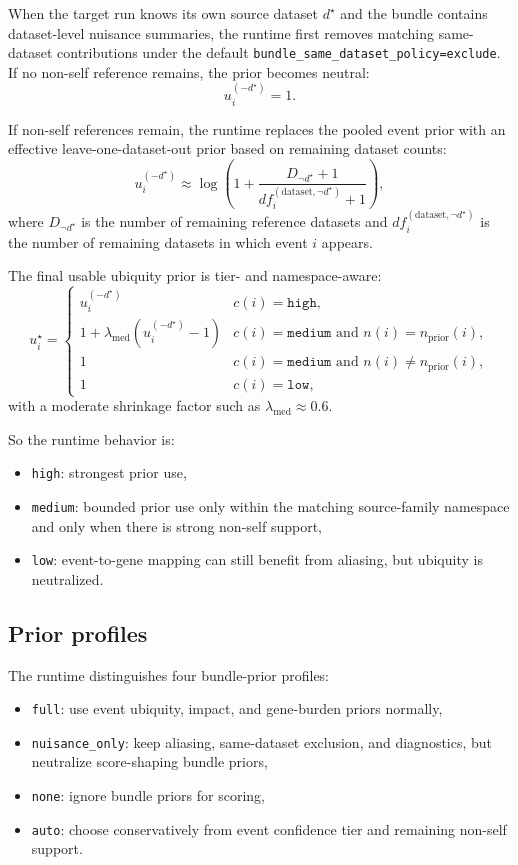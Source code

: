 \documentclass[11pt]{article}
\begin{document}
When the target run knows its own source dataset $d^\star$ and the bundle contains dataset-level nuisance summaries, the runtime first removes matching same-dataset contributions under the default \texttt{bundle\_same\_dataset\_policy=exclude}. If no non-self reference remains, the prior becomes neutral:
\[
u_i^{(-d^\star)} = 1.
\]

If non-self references remain, the runtime replaces the pooled event prior with an effective leave-one-dataset-out prior based on remaining dataset counts:
\[
u_i^{(-d^\star)} \approx \log\!\left(1 + \frac{D_{\neg d^\star}+1}{df_i^{(\mathrm{dataset}, \neg d^\star)}+1}\right),
\]
where $D_{\neg d^\star}$ is the number of remaining reference datasets and $df_i^{(\mathrm{dataset}, \neg d^\star)}$ is the number of remaining datasets in which event $i$ appears.

The final usable ubiquity prior is tier- and namespace-aware:
\[
u_i^\star =
\begin{cases}
u_i^{(-d^\star)} & c(i)=\texttt{high},\\
1 + \lambda_{\mathrm{med}} \left(u_i^{(-d^\star)} - 1\right) & c(i)=\texttt{medium} \text{ and } n(i)=n_{\mathrm{prior}}(i),\\
1 & c(i)=\texttt{medium} \text{ and } n(i)\neq n_{\mathrm{prior}}(i),\\
1 & c(i)=\texttt{low},
\end{cases}
\]
with a moderate shrinkage factor such as $\lambda_{\mathrm{med}} \approx 0.6$.

So the runtime behavior is:
\begin{itemize}[leftmargin=2em]
\item \texttt{high}: strongest prior use,
\item \texttt{medium}: bounded prior use only within the matching source-family namespace and only when there is strong non-self support,
\item \texttt{low}: event-to-gene mapping can still benefit from aliasing, but ubiquity is neutralized.
\end{itemize}

\subsection{Prior profiles}
The runtime distinguishes four bundle-prior profiles:
\begin{itemize}[leftmargin=2em]
\item \texttt{full}: use event ubiquity, impact, and gene-burden priors normally,
\item \texttt{nuisance\_only}: keep aliasing, same-dataset exclusion, and diagnostics, but neutralize score-shaping bundle priors,
\item \texttt{none}: ignore bundle priors for scoring,
\item \texttt{auto}: choose conservatively from event confidence tier and remaining non-self support.
\end{itemize}
\end{document}
